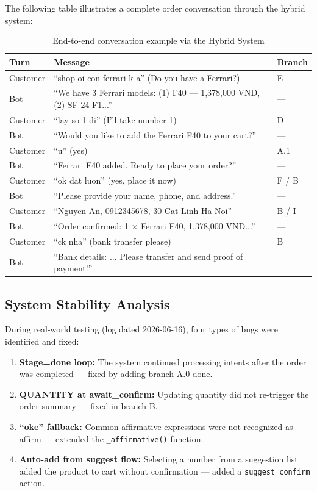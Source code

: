 \documentclass[12pt, a4paper]{report}
\begin{document}
The following table illustrates a complete order conversation
through the hybrid system:

\begin{table}[H]
\centering
\caption{End-to-end conversation example via the Hybrid System}
\label{tab:convo_example}
\begin{tabularx}{\linewidth}{lXl}
\toprule
\textbf{Turn} & \textbf{Message} & \textbf{Branch} \\
\midrule
Customer & ``shop oi con ferrari k a'' (Do you have a Ferrari?) & E \\
Bot      & ``We have 3 Ferrari models: (1) F40 --- 1,378,000 VND, (2) SF-24 F1...'' & --- \\
Customer & ``lay so 1 di'' (I'll take number 1)  & D \\
Bot      & ``Would you like to add the Ferrari F40 to your cart?'' & --- \\
Customer & ``u'' (yes)                           & A.1 \\
Bot      & ``Ferrari F40 added. Ready to place your order?'' & --- \\
Customer & ``ok dat luon'' (yes, place it now)   & F / B \\
Bot      & ``Please provide your name, phone, and address.'' & --- \\
Customer & ``Nguyen An, 0912345678, 30 Cat Linh Ha Noi'' & B / I \\
Bot      & ``Order confirmed: 1 $\times$ Ferrari F40, 1,378,000 VND...'' & --- \\
Customer & ``ck nha'' (bank transfer please)     & B \\
Bot      & ``Bank details: ... Please transfer and send proof of payment!'' & --- \\
\bottomrule
\end{tabularx}
\end{table}

\subsection{System Stability Analysis}

During real-world testing (log dated 2026-06-16),
four types of bugs were identified and fixed:

\begin{enumerate}
  \item \textbf{Stage=done loop:} The system continued processing intents
        after the order was completed --- fixed by adding branch A.0-done.
  \item \textbf{QUANTITY at await\_confirm:} Updating quantity did not
        re-trigger the order summary --- fixed in branch B.
  \item \textbf{``oke'' fallback:} Common affirmative expressions
        were not recognized as affirm --- extended the \texttt{\_affirmative()} function.
  \item \textbf{Auto-add from suggest flow:} Selecting a number from a suggestion list
        added the product to cart without confirmation ---
        added a \texttt{suggest\_confirm} action.
\end{enumerate}
\end{document}
